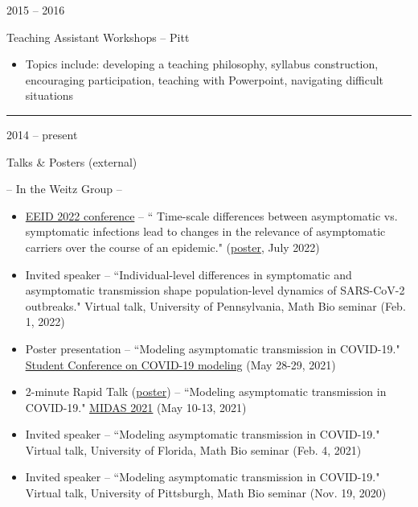 \documentclass[a4paper,10pt]{article}
\newlength{\cvcolumngapwidth}
\newlength{\cvleftcolumnwidth}
\newlength{\cvrightcolumnwidth}
\newcommand{\cvsectionstyle}[1]{{\normalsize\cvsectionfont\textcolor{cvsectioncolor}{#1}}}
\newcommand{\cvtitlestyle}[1]{{\large\cvtitlefont\textcolor{cvtitlecolor}{#1}}}
\newcommand{\cvheadingstyle}[1]{{\normalsize\cvheadingfont\textcolor{cvheadingcolor}{#1}}}
\newlength{\cvafteritemskipamount}
\newlength{\cvaftersectionskipamount}
\newlength{\cvbetweensectionandheadingextraskipamount}
\newlength{\cvaftertitleskipamount}
\newlength{\cvparskip}
\newcommand{\cvsection}[1]{
            \begin{minipage}[t]{\cvleftcolumnwidth}
                \raggedleft\cvsectionstyle{#1}
            \end{minipage}%
            \hspace{\cvcolumngapwidth}%
            \begin{minipage}[t]{\cvrightcolumnwidth}
                \textcolor{cvrulecolor}{\rule{\cvrightcolumnwidth}{0.3mm}}
            \end{minipage}
        
            \vspace{\cvaftersectionskipamount}
        }
\newcommand{\cvitem}[2]{
            \begin{minipage}[t]{\cvleftcolumnwidth}
                \raggedleft #1
            \end{minipage}%
            \hspace{\cvcolumngapwidth}%
            \begin{minipage}[t]{\cvrightcolumnwidth}
                \setlength{\parskip}{\cvparskip} #2
            \end{minipage}
        
            \vspace{\cvafteritemskipamount}
        }
\newcommand{\cvtitle}[1]{
            \cvtitlestyle{#1}
        
            \vspace{\cvaftertitleskipamount}
            \vspace{-\cvparskip}
        }
\begin{document}
        \cvitem{
            \cvheadingstyle{2015 -- 2016}
        }{
            \cvtitle{Teaching Assistant Workshops -- Pitt}
            \begin{itemize}[leftmargin=*]
                \item Topics include: developing a teaching philosophy, syllabus construction, encouraging participation, teaching with Powerpoint, navigating difficult situations
            \end{itemize}
            
        }
        
            
        \cvsection{PRESENTATIONS}
        \vspace{\cvbetweensectionandheadingextraskipamount}
        
        \cvitem{
            \cvheadingstyle{2014 -- present}
        }{
        
            \cvtitle{Talks \& Posters (external)}
		-- In the Weitz Group --
            \begin{itemize}[leftmargin=*]
		\item \href{https://www.eeid-2022-emory.org/}{EEID 2022 conference} -- `` Time-scale differences between asymptomatic vs. symptomatic infections lead to changes in the relevance of asymptomatic carriers over the course of an epidemic." (\href{https://github.com/Jeremy-D-Harris/EEID2022poster_asymptomatic}{poster}, July 2022)
		\item Invited speaker -- ``Individual-level differences in symptomatic and asymptomatic transmission shape population-level dynamics of SARS-CoV-2 outbreaks." Virtual talk, University of Pennsylvania, Math Bio seminar (Feb. 1, 2022)
		\item Poster presentation -- ``Modeling asymptomatic transmission in COVID-19."  \href{https://sites.google.com/view/nsfstudentconference2021/home}{\underline{Student Conference on COVID-19 modeling}}  (May 28-29, 2021)
            	\item 2-minute Rapid Talk (\href{https://github.com/Jeremy-D-Harris/poster_MIDAS2021.git}{poster}) -- ``Modeling asymptomatic transmission in COVID-19."  \href{https://midasnetwork.us/midas-network-annual-meeting-midas-2021/}{\underline{MIDAS 2021}}  (May 10-13, 2021) 
		\item Invited speaker -- ``Modeling asymptomatic transmission in COVID-19." Virtual talk, University of Florida, Math Bio seminar (Feb. 4, 2021) 
		\item Invited speaker -- ``Modeling asymptomatic transmission in COVID-19." Virtual talk, University of Pittsburgh, Math Bio seminar (Nov. 19, 2020) 

        	    \end{itemize}

}
\end{document}

